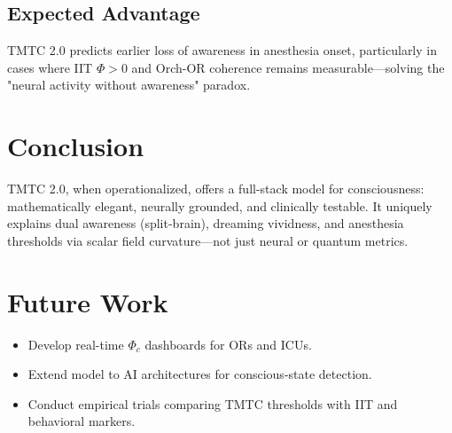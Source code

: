 \documentclass[12pt]{article}
\theoremstyle{plain}
\begin{document}
\subsection*{Expected Advantage}
TMTC 2.0 predicts earlier loss of awareness in anesthesia onset, particularly in cases where IIT $\Phi > 0$ and Orch-OR coherence remains measurable—solving the "neural activity without awareness" paradox.

\section{Conclusion}
TMTC 2.0, when operationalized, offers a full-stack model for consciousness: mathematically elegant, neurally grounded, and clinically testable. It uniquely explains dual awareness (split-brain), dreaming vividness, and anesthesia thresholds via scalar field curvature—not just neural or quantum metrics.

\section*{Future Work}
\begin{itemize}
    \item Develop real-time $\Phi_c$ dashboards for ORs and ICUs.
    \item Extend model to AI architectures for conscious-state detection.
    \item Conduct empirical trials comparing TMTC thresholds with IIT and behavioral markers.
\end{itemize}

\nocite{*}
\printbibliography
\end{document}
